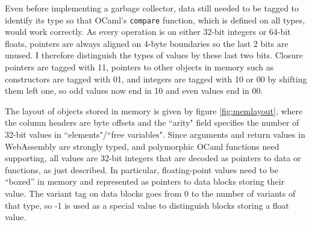 Even before implementing a garbage collector, data still needed to be tagged to identify its type so that OCaml's \verb|compare| function, which is defined on all types, would work correctly. As every operation is on either 32-bit integers or 64-bit floats, pointers are always aligned on 4-byte boundaries so the last 2 bits are unused. I therefore distinguish the types of values by these last two bits. Closure pointers are tagged with 11, pointers to other objects in memory such as constructors are tagged with 01, and integers are tagged with 10 or 00 by shifting them left one, so odd  values now end in 10 and even values end in 00. 

The layout of objects stored in memory is given by figure \ref{fig:memlayout}, where the column headers are byte offsets and the ``arity" field specifies the number of 32-bit values in ``elements"/``free variables". Since arguments and return values in WebAssembly are strongly typed, and polymorphic OCaml functions need supporting, all values are 32-bit integers that are decoded as pointers to data or functions, as just described. In particular, floating-point values need to be ``boxed'' in memory and represented as pointers to data blocks storing their value. The variant tag on data blocks goes from 0 to the number of variants of that type, so -1 is used as a special value to distinguish blocks storing a float value.\\


